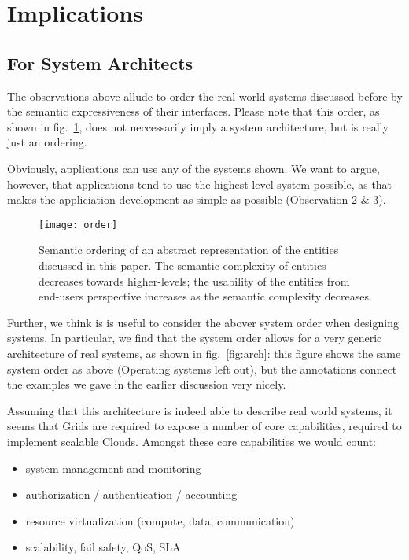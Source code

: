 \documentclass[conference,final]{IEEEtran}
\begin{document}
\section{Implications}

 \subsection{For System Architects}

  The observations above allude to order the real world systems
  discussed before by the semantic expressiveness of their interfaces.
  Please note that this order, as shown in fig.~\ref{fig:order}, does
  not neccessarily imply a system architecture, but is really just an
  ordering.  

  Obviously, applications can use any of the systems shown.  We want
  to argue, however, that applications tend to use the highest level
  system possible, as that makes the appliciation development as
  simple as possible (Observation 2 \& 3).
 
  \begin{figure}[ht!]
   \begin{center}
    \texttt{[image: order]}
    \caption{Semantic ordering of an abstract representation of the
      entities discussed in this paper.  The semantic complexity of
      entities decreases towards higher-levels; the usability of the 
      entities from end-users perspective increases as the semantic 
      complexity decreases.}
    \label{fig:order}
   \end{center}
  \end{figure}

  Further, we think is is useful to consider the abover system order
  when designing systems.  In particular, we find that the system
  order allows for a very generic architecture of real systems, as
  shown in fig.~\ref{fig:arch}: this figure shows the same system
  order as above (Operating systems left out), but the annotations
  connect the examples we gave in the earlier discussion very nicely.

  Assuming that this architecture is indeed able to describe real
  world systems, it seems that Grids are required to expose a number
  of core capabilities, required to implement scalable Clouds.
  Amongst these core capabilities we would count:

  \begin{itemize}
   \item system management and monitoring
   \item authorization / authentication / accounting
   \item resource virtualization (compute, data, communication)
   \item scalability, fail safety, QoS, SLA
  \end{itemize}
\end{document}
